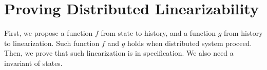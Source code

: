 
\section{Proving Distributed Linearizability}
\label{sec:proving distributed linearizability} 

First, we propose a function $f$ from state to history, and a function $g$ from history to linearization. Such function $f$ and $g$ holds when distributed system proceed. Then, we prove that such linearization is in specification. We also need a invariant of states. 


 

